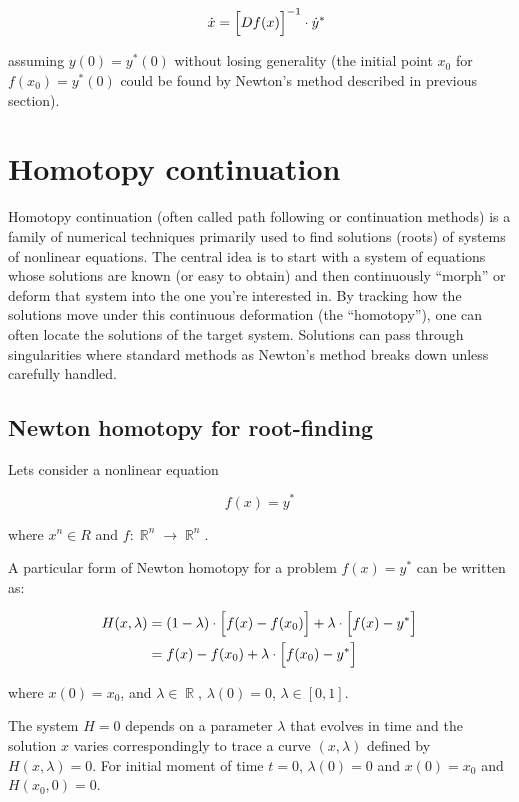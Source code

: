\documentclass[11pt,american]{article}
\DeclareMathOperator{\R}{\mathbb{R}}
\begin{document}
\begin{equation}\label{newton_track}
\quad \dot x = \Bigl[ D f(x) \Bigr]^{-1} \cdot \dot y^*
\end{equation}

assuming $y(0) = y^*(0)$ without losing generality (the initial point $x_0$ for $f(x_0) = y^*(0)$ could be found by Newton's method described in previous section).


\section{Homotopy continuation}

Homotopy continuation (often called path following or continuation methods) is a family of numerical techniques primarily used to find solutions (roots) of systems of nonlinear equations. The central idea is to start with a system of equations whose solutions are known (or easy to obtain) and then continuously “morph” or deform that system into the one you’re interested in. By tracking how the solutions move under this continuous deformation (the “homotopy”), one can often locate the solutions of the target system.
Solutions can pass through singularities where standard methods as Newton's method breaks down unless carefully handled.

\subsection{Newton homotopy for root-finding}

Lets consider a nonlinear equation 

\begin{equation}
f(x) = y^*
\end{equation}

where $x^n \in R$ and $f: \R^n \to \R^n$.

A particular form of Newton homotopy for a problem $f(x) = y^*$ can be written as:

\begin{align}\label{hom_func}
H(x,\lambda) &= (1 - \lambda) \cdot \Bigl[ f(x) - f(x_0) \Bigr] + \lambda \cdot \Bigl[ f(x) - y^* \Bigr] \\
&= f(x) - f(x_0) + \lambda \cdot \Bigl[ f(x_0) - y^* \Bigr] 
\end{align}

where $x(0) = x_0$, and $\lambda \in \R$, $\lambda(0) = 0$, $\lambda \in [0,1]$.

The system $H = 0$ depends on a parameter $\lambda$ that evolves in time and the solution $x$ varies correspondingly to trace a curve $(x, \lambda)$ defined by $H(x, \lambda) = 0$.
For initial moment of time $t = 0$, $\lambda(0) = 0$ and $x(0) = x_0$ and $H(x_0,0) = 0$.
\end{document}
